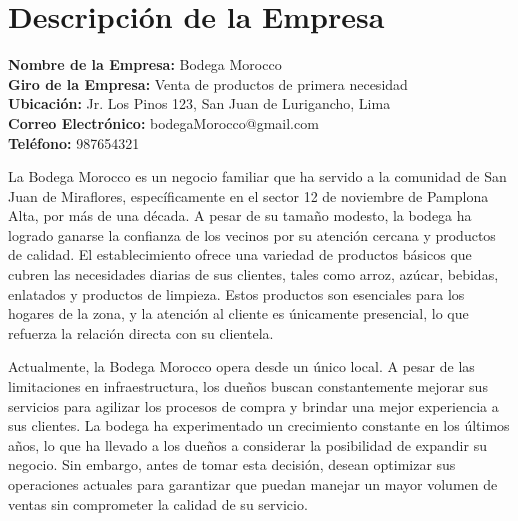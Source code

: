\documentclass{article}
\newenvironment{descripcionDeLaEmpresa}{}{}
\begin{document}
\begin{descripcionDeLaEmpresa}
  \section{Descripción de la Empresa}

  \begin{spacing}{1.5}
    \noindent
    \textbf{Nombre de la Empresa:} Bodega Morocco \\
    \textbf{Giro de la Empresa:} Venta de productos de primera necesidad \\
    \textbf{Ubicación:} Jr. Los Pinos 123, San Juan de Lurigancho, Lima \\
    \textbf{Correo Electrónico:} bodegaMorocco@gmail.com \\
    \textbf{Teléfono:} 987654321
  \end{spacing}

  La Bodega Morocco es un negocio familiar que ha servido a la comunidad de San Juan de Miraflores, específicamente en el sector 12 de noviembre de Pamplona Alta, por más de una década. A pesar de su tamaño modesto, la bodega ha logrado ganarse la confianza de los vecinos por su atención cercana y productos de calidad. El establecimiento ofrece una variedad de productos básicos que cubren las necesidades diarias de sus clientes, tales como arroz, azúcar, bebidas, enlatados y productos de limpieza. Estos productos son esenciales para los hogares de la zona, y la atención al cliente es únicamente presencial, lo que refuerza la relación directa con su clientela.

  Actualmente, la Bodega Morocco opera desde un único local. A pesar de las limitaciones en infraestructura, los dueños buscan constantemente mejorar sus servicios para agilizar los procesos de compra y brindar una mejor experiencia a sus clientes. La bodega ha experimentado un crecimiento constante en los últimos años, lo que ha llevado a los dueños a considerar la posibilidad de expandir su negocio. Sin embargo, antes de tomar esta decisión, desean optimizar sus operaciones actuales para garantizar que puedan manejar un mayor volumen de ventas sin comprometer la calidad de su servicio.

\end{descripcionDeLaEmpresa}
\end{document}
